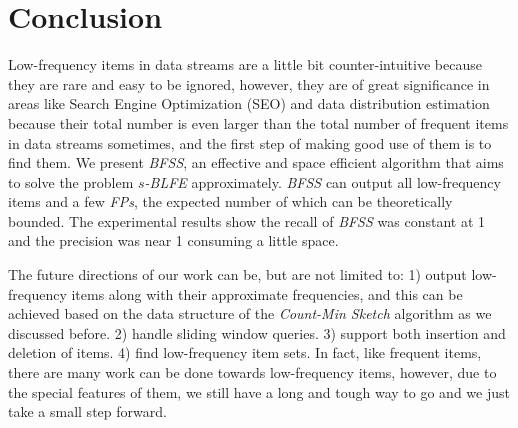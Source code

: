 \documentclass[conference]{IEEEtran}
\begin{document}
%




\section{Conclusion}
Low-frequency items in data streams are a little bit counter-intuitive because they are rare and easy to be ignored, however, they are of great significance in areas like Search Engine Optimization (SEO) and data distribution estimation because their total number is even larger than the total number of frequent items in data streams sometimes, and the first step of making good use of them is to find them. We present \emph{BFSS}, an effective and space efficient algorithm that aims to solve the problem \emph{$s$-BLFE} approximately. \emph{BFSS} can output all low-frequency items and a few \emph{FPs}, the expected number of which can be theoretically bounded. The experimental results show the recall of \emph{BFSS} was constant at 1 and the precision was near 1 consuming a little space.\par
The future directions of our work can be, but are not limited to: 1) output low-frequency items along with their approximate frequencies, and this can be achieved based on the data structure of the \emph{Count-Min Sketch} algorithm as we discussed before. 2) handle sliding window queries. 3) support both insertion and deletion of items. 4) find low-frequency item sets. In fact, like frequent items, there are many work can be done towards low-frequency items, however, due to the special features of them, we still have a long and tough way to go and we just take a small step forward.
\end{document}
